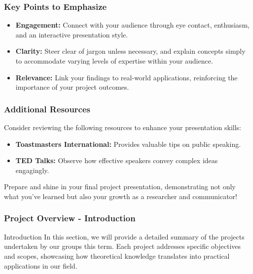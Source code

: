 \documentclass[aspectratio=169]{beamer}
\begin{document}
\begin{frame}[fragile]
    \frametitle{Key Points to Emphasize}
    \begin{itemize}
        \item \textbf{Engagement:} Connect with your audience through eye contact, enthusiasm, and an interactive presentation style.
        \item \textbf{Clarity:} Steer clear of jargon unless necessary, and explain concepts simply to accommodate varying levels of expertise within your audience.
        \item \textbf{Relevance:} Link your findings to real-world applications, reinforcing the importance of your project outcomes.
    \end{itemize}
\end{frame}

\begin{frame}[fragile]
    \frametitle{Additional Resources}
    Consider reviewing the following resources to enhance your presentation skills:
    \begin{itemize}
        \item \textbf{Toastmasters International:} Provides valuable tips on public speaking.
        \item \textbf{TED Talks:} Observe how effective speakers convey complex ideas engagingly.
    \end{itemize}
    Prepare and shine in your final project presentation, demonstrating not only what you've learned but also your growth as a researcher and communicator!
\end{frame}

\begin{frame}[fragile]
    \frametitle{Project Overview - Introduction}
    \begin{block}{Introduction}
        In this section, we will provide a detailed summary of the projects undertaken by our groups this term. Each project addresses specific objectives and scopes, showcasing how theoretical knowledge translates into practical applications in our field.
    \end{block}
\end{frame}
\end{document}
